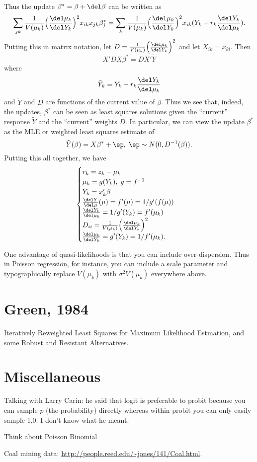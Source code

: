 \documentclass{article}
\newcommand{\graddel}[2]{\frac{\del #1}{\del #2}}
\begin{document}
Thus the update $\beta^* = \beta + \del \beta$ can be written as
\[
\sum_{jk} \frac{1}{V(\mu_k)} \Big(\graddel{\mu_k}{Y_k}\Big)^2 x_{ik} x_{jk} 
\beta_j^*
=
\sum_{k} \frac{1}{V(\mu_k)}\Big(\graddel{\mu_k}{Y_k} \Big)^2  x_{ik} (Y_k + r_{k} 
\frac{\del Y_k}{\del \mu_k}).
\]
Putting this in matrix notation, let $D =
\frac{1}{V(\mu_k)}\Big(\graddel{\mu_k}{Y_k} \Big)^2$ and let $X_{ik} = x_{ki}$.
Then
\[
X' D X \beta^* = D X' \tilde Y
\]
where
\[
\tilde Y_k = Y_k + r_k \graddel{Y_k}{\mu_k}
\]
and $\tilde Y$ and $D$ are functions of the current value of $\beta$.  Thus we
see that, indeed, the updates, $\beta^*$ can be seen as least squares solutions
given the ``current'' response $\tilde Y$ and the ``current'' weights $D$.  In
particular, we can view the update $\beta^*$ as the MLE or weighted least
squares estimate of
\[
\tilde Y(\beta) = X \beta^* + \ep, \; \ep \sim N(0, D^{-1}(\beta)).
\]
Putting this all together, we have
\[
\begin{cases}
  r_k = z_k - \mu_k \\
  \mu_k = g(Y_k), \; g = f^{-1} \\
  Y_k = x_k' \beta \\
  \graddel{Y}{\mu}(\mu) = f'(\mu) = 1/g'(f(\mu)) \\
  \graddel{Y_k}{\mu_k} = 1/g'(Y_k) = f'(\mu_k) \\
  D_{ii} = \frac{1}{V(\mu_k)}\Big(\graddel{\mu_k}{Y_k} \Big)^2 \\
  \graddel{\mu_k}{Y_k} = g'(Y_k) = 1/f'(\mu_k).
\end{cases}
\]

One advantage of quasi-likelihoods is that you can include over-dispersion.
Thus in Poisson regression, for instance, you can include a scale parameter and
typographically replace $V(\mu_k)$ with $\sigma^2 V(\mu_k)$ everywhere above.

\section{Green, 1984}

Iteratively Reweighted Least Squares for Maximum Likelihood Estmation, and some
Robust and Resistant Alternatives.


\section{Miscellaneous}

\begin{outline}

\1 Talking with Larry Carin: he said that logit is preferable to probit because
you can sample $p$ (the probability) directly whereas within probit you can only
easily sample 1,0.  I don't know what he meant.

\1 Think about Poisson Binomial

\1 Coal mining data: \url{http://people.reed.edu/~jones/141/Coal.html}.

\end{outline}
\end{document}
